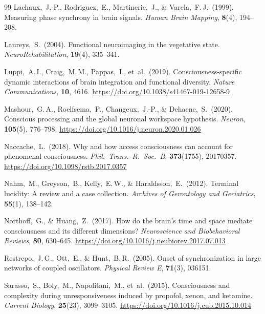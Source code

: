 \documentclass[11pt,a4paper]{article}
\theoremstyle{plain}
\theoremstyle{definition}
\theoremstyle{remark}
\begin{document}
\begin{thebibliography}{99}
Lachaux,~J.-P., Rodriguez,~E., Martinerie,~J., \& Varela,~F.\,J.\ (1999).
Measuring phase synchrony in brain signals.
\textit{Human Brain Mapping}, \textbf{8}(4), 194--208.

Laureys,~S.\ (2004).
Functional neuroimaging in the vegetative state.
\textit{NeuroRehabilitation}, \textbf{19}(4), 335--341.

Luppi,~A.\,I., Craig,~M.\,M., Pappas,~I., et~al.\ (2019).
Consciousness-specific dynamic interactions of brain integration and functional diversity.
\textit{Nature Communications}, \textbf{10}, 4616.
\url{https://doi.org/10.1038/s41467-019-12658-9}

Mashour,~G.\,A., Roelfsema,~P., Changeux,~J.-P., \& Dehaene,~S.\ (2020).
Conscious processing and the global neuronal workspace hypothesis.
\textit{Neuron}, \textbf{105}(5), 776--798.
\url{https://doi.org/10.1016/j.neuron.2020.01.026}

Naccache,~L.\ (2018).
Why and how access consciousness can account for phenomenal consciousness.
\textit{Phil.\ Trans.\ R.\ Soc.\ B}, \textbf{373}(1755), 20170357.
\url{https://doi.org/10.1098/rstb.2017.0357}

Nahm,~M., Greyson,~B., Kelly,~E.\,W., \& Haraldsson,~E.\ (2012).
Terminal lucidity: A review and a case collection.
\textit{Archives of Gerontology and Geriatrics}, \textbf{55}(1), 138--142.

Northoff,~G., \& Huang,~Z.\ (2017).
How do the brain's time and space mediate consciousness and its different dimensions?
\textit{Neuroscience and Biobehavioral Reviews}, \textbf{80}, 630--645.
\url{https://doi.org/10.1016/j.neubiorev.2017.07.013}

Restrepo,~J.\,G., Ott,~E., \& Hunt,~B.\,R.\ (2005).
Onset of synchronization in large networks of coupled oscillators.
\textit{Physical Review E}, \textbf{71}(3), 036151.

Sarasso,~S., Boly,~M., Napolitani,~M., et~al.\ (2015).
Consciousness and complexity during unresponsiveness induced by propofol, xenon, and ketamine.
\textit{Current Biology}, \textbf{25}(23), 3099--3105.
\url{https://doi.org/10.1016/j.cub.2015.10.014}


\end{thebibliography}
\end{document}
